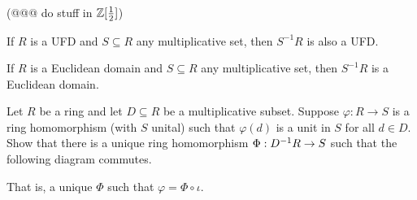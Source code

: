 \begin{exercise}
(@@@ do stuff in \(\ZZ[\frac{1}{2}]\))
\end{exercise}


\begin{exercise}
If \(R\) is a UFD and \(S \subseteq R\) any multiplicative set, then \(S^{-1}R\) is also a UFD.
\end{exercise}


\begin{exercise}
If \(R\) is a Euclidean domain and \(S \subseteq R\) any multiplicative set, then \(S^{-1}R\) is a Euclidean domain.
\end{exercise}


\begin{exercise}
Let \(R\) be a ring and let \(D \subseteq R\) be a multiplicative subset.
Suppose \(\varphi : R \rightarrow S\) is a ring homomorphism (with \(S\) unital) such that \(\varphi(d)\) is a unit in \(S\) for all \(d \in D\). Show that there is a unique ring homomorphism \(\Phi : \LOCALIZE{R}{D} \rightarrow S\) such that the following diagram commutes.
\begin{center}
\end{center}
That is, a unique \(\Phi\) such that \(\varphi = \Phi \circ \iota\).
\end{exercise}

